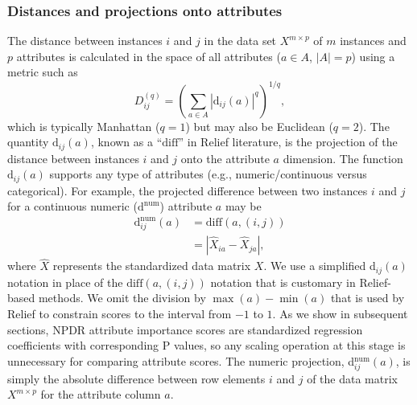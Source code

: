 \documentclass[10pt]{article}
\begin{document}
\subsubsection{Distances and projections onto attributes}
The distance between instances $i$ and $j$ in the data set $X^{m \times p}$ of $m$ instances and $p$ attributes is calculated in the space of all attributes ($a \in A$, $|A|=p$) using a metric such as
\begin{equation}\label{eq:D}
D^{(q)}_{ij}=\left(\sum_{a\in A}|\text{d}_{ij}(a)|^q\right)^{1/q},
\end{equation}
which is typically Manhattan ($q=1$) but may also be Euclidean ($q=2$). The quantity 
$\text{d}_{ij}(a)$,
known as a ``$\text{diff}$'' in Relief literature, is the projection of the distance between instances $i$ and $j$ onto the attribute $a$ dimension. The 
function $\text{d}_{ij}(a)$ supports any type of attributes
(e.g., numeric/continuous versus categorical).
For example, the projected difference between two instances $i$ and $j$ for a continuous numeric ($\text{d}^{\text{num}}$) attribute $a$ may be
\begin{equation}\label{eq:diff}
\begin{aligned}
\text{d}^{\text{num}}_{ij}(a)&=\text{diff}(a,(i,j))\\
                                            & = {|\hat{X}_{ia}-\hat{X}_{ja}|},
\end{aligned}
\end{equation}
where $\hat{X}$ represents the standardized data matrix $X$.
We use a simplified d$_{ij}(a)$ notation in place of the $\text{diff}(a,(i,j))$ notation that is customary in Relief-based methods.
We omit the division by $\max(a)-\min(a)$ that is used by Relief to constrain scores to the interval from $-1$ to $1$.
As we show in subsequent sections, NPDR attribute importance scores are standardized regression coefficients with corresponding P values, so any scaling operation at this stage is unnecessary for comparing attribute scores. 
The numeric projection, d$^{\text{num}}_{ij}(a)$, is simply the absolute difference between row elements $i$ and $j$ of the data matrix $X^{m \times p}$ for the attribute column $a$. 
\end{document}
